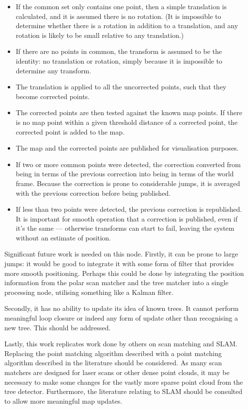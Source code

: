 \documentclass[12pt,oneside,a4paper]{book}
\begin{document}
\begin{itemize}
\item If the common set only contains one point, then a simple
  translation is calculated, and it is assumed there is no
  rotation. (It is impossible to determine whether there is a rotation
  in addition to a translation, and any rotation is likely to be small
  relative to any translation.)
\item If there are no points in common, the transform is assumed to be
  the identity: no translation or rotation, simply because it is
  impossible to determine any transform.
\item The translation is applied to all the uncorrected points, such
  that they become corrected points.
\item The corrected points are then tested against the known map
  points. If there is no map point within a given threshold distance
  of a corrected point, the corrected point is added to the map.
\item The map and the corrected points are published for visualisation
  purposes.
\item If two or more common points were detected, the correction
  converted from being in terms of the previous correction into being
  in terms of the world frame. Because the correction is prone to
  considerable jumps, it is averaged with the previous correction
  before being published.
\item If less than two points were detected, the previous correction
  is republished. It is important for smooth operation that a
  correction is published, even if it's the same --- otherwise
  transforms can start to fail, leaving the system without an estimate
  of position.
\end{itemize}

Significant future work is needed on this node.  Firstly, it can be
prone to large jumps: it would be good to integrate it with some form
of filter that provides more smooth positioning. Perhaps this
could be done by integrating the position information from the polar
scan matcher and the tree matcher into a single processing node,
utilising something like a Kalman filter. %

Secondly, it has no ability to update its idea of known trees. It
cannot perform meaningful loop closure or indeed any form of update
other than recognising a new tree. 
This should be addressed.

Lastly, this work replicates work done by others on scan matching and
SLAM. Replacing the point matching algorithm described with a point
matching algorithm described in the literature should be considered.
As many scan matchers are designed for laser scans or other dense
point clouds, it may be necessary to make some changes for the vastly
more sparse point cloud from the tree detector. Furthermore, the
literature relating to SLAM should be consulted to allow more
meaningful map updates.
\end{document}
